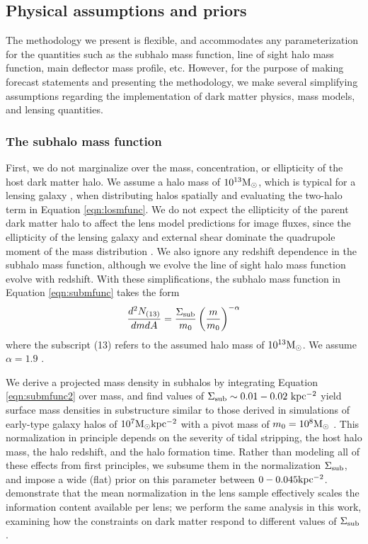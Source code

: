 \subsection{Physical assumptions and priors}
\label{ssec:assumptionsandpriors}
The methodology we present is flexible, and accommodates any parameterization for the quantities such as the subhalo mass function, line of sight halo mass function, main deflector mass profile, etc. However, for the purpose of making forecast statements and presenting the methodology, we make several simplifying assumptions regarding the implementation of dark matter physics, mass models, and lensing quantities. 

\subsubsection{The subhalo mass function}
First, we do not marginalize over the mass, concentration, or ellipticity of the host dark matter halo. We assume a halo mass of $10^{13}{\rm{M}_{\odot}}$, which is typical for a lensing galaxy \citep{Gavazzi++07}, when distributing halos spatially and evaluating the two-halo term in Equation \ref{eqn:losmfunc}. We do not expect the ellipticity of the parent dark matter halo to affect the lens model predictions for image fluxes, since the ellipticity of the lensing galaxy and external shear dominate the quadrupole moment of the mass distribution \citep{Keeton++97}. We also ignore any redshift dependence in the subhalo mass function, although we evolve the line of sight halo mass function evolve with redshift. With these simplifications, the subhalo mass function in Equation \ref{eqn:submfunc} takes the form 
\begin{equation}
\label{eqn:submfunc2}
\frac{d^2N_{(13)}}{dmdA} = \frac{\Sigma_{\rm{sub}}}{m_0} \left(\frac{m}{m_0}\right)^{-\alpha} 
\end{equation}
where the subscript (13) refers to the assumed halo mass of $10^{13} {\rm{M}_{\odot}}$.  We assume $\alpha = 1.9$ \citep{Springel++08,Fiacconi++16}. 

We derive a projected mass density in subhalos by integrating Equation \ref{eqn:submfunc2} over mass, and find values of $\Sigma_{\rm{sub}} \sim 0.01-0.02 \ \rm{kpc^{-2}}$ yield surface mass densities in substructure similar to those derived in simulations of early-type galaxy halos of $10^7 {\rm{M}_{\odot}} \rm{kpc^{-2}}$ with a pivot mass of $m_0 = 10^{8} {\rm{M}_{\odot}}$ \citep{Fiacconi++16}. This normalization in principle depends on the severity of tidal stripping, the host halo mass, the halo redshift, and the halo formation time. Rather than modeling all of these effects from first principles, we subsume them in the normalization $\Sigma_{\rm{sub}}$, and impose a wide (flat) prior on this parameter between $0-0.045 \rm{kpc^{-2}}$. \citet{Gilman++18} demonstrate that the mean normalization in the lens sample effectively scales the information content available per lens; we perform the same analysis in this work, examining how the constraints on dark matter respond to different values of $\Sigma_{\rm{sub}}$. 

